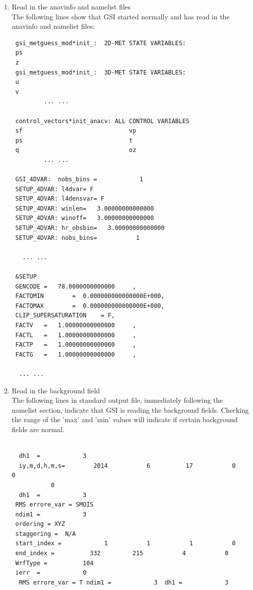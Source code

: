 \begin{enumerate}
\item Read in the anavinfo and namelist files\\

The following lines show that GSI started normally and has read in the anavinfo and namelist files:
\begin{scriptsize}
\begin{verbatim}
 gsi_metguess_mod*init_:  2D-MET STATE VARIABLES:
 ps
 z
 gsi_metguess_mod*init_:  3D-MET STATE VARIABLES:
 u
 v
         ... ... 
         
 control_vectors*init_anacv: ALL CONTROL VARIABLES
 sf                              vp
 ps                              t
 q                               oz
         ... ...
         
 GSI_4DVAR:  nobs_bins =            1
 SETUP_4DVAR: l4dvar= F
 SETUP_4DVAR: l4densvar= F
 SETUP_4DVAR: winlen=   3.00000000000000
 SETUP_4DVAR: winoff=   3.00000000000000
 SETUP_4DVAR: hr_obsbin=   3.00000000000000
 SETUP_4DVAR: nobs_bins=           1

   ... ...
   
 &SETUP
 GENCODE =   78.0000000000000     ,
 FACTQMIN        =  0.000000000000000E+000,
 FACTQMAX        =  0.000000000000000E+000,
 CLIP_SUPERSATURATION    = F,
 FACTV   =   1.00000000000000     ,
 FACTL   =   1.00000000000000     ,
 FACTP   =   1.00000000000000     ,
 FACTG   =   1.00000000000000     ,

  ... ... 
\end{verbatim}
\end{scriptsize}
\item Read in the background field\\

The following lines in standard output file, immediately following the namelist section, indicate that GSI is reading the background fields.  Checking the range of the 'max' and 'min' values will indicate if certain background fields are normal. 

\begin{scriptsize}
\begin{verbatim}

  dh1  =            3
  iy,m,d,h,m,s=        2014           6          17           0           0
           0
  dh1  =            3
 RMS errore_var = SMOIS
 ndim1 =            3
 ordering = XYZ
 staggering =  N/A
 start_index =            1           1           1           0
 end_index =          332         215           4           0
 WrfType =          104
 ierr  =            0
  RMS errore_var = T ndim1 =            3  dh1 =            3


\end{verbatim}
\end{scriptsize}
\end{enumerate}
